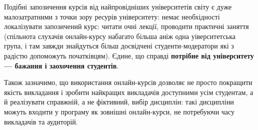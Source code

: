 \documentclass[14pt, a4paper]{extarticle}  %
\begin{document}
Подібні запозичення курсів від найпровідніших університетів світу є дуже малозатратними з точки зору ресурів університету: немає необхідності локалізувати запозичений курс: читати очні лекції, проводити практичні заняття (спільнота слухачів онлайн-курсу набагато більша аніж одна уіверситетська група, і там завжди знайдуться більш досвідчені студенти-модератори які з радістю допоможуть початківцям). Єдине, що справді \textbf{потрібне від університету --- бажання і заохочення студентів}.

Також зазначимо, що використання онлайн-курсів дозволяє не просто покращити якість викладання і зробити найкращих викладачів доступними усім студентам, а й реалізувати справжній, а не фіктивний, вибір дисциплін: такі дисципліни можуть входити у програму як зовнішні онлайн-курси, не потребуючи часу викладачів та аудиторій. 
\end{document}
